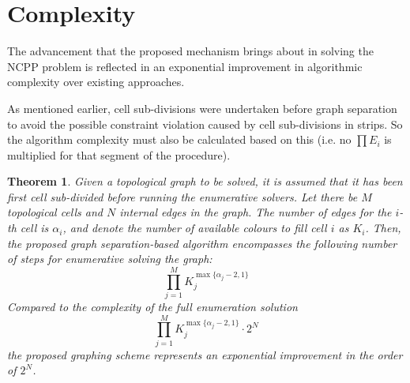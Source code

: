 \documentclass[journal]{IEEEtran}
\newtheorem{theorem}{Theorem}
\newtheorem{corollary}[theorem]{Corollary}
\begin{document}

\section{Complexity}
\label{section_complexity}
The advancement that the proposed mechanism brings about in solving the NCPP problem is reflected in an exponential improvement in algorithmic complexity over existing approaches.

As mentioned earlier, cell sub-divisions were undertaken before graph separation to avoid the possible  constraint violation caused by cell sub-divisions in strips. So the algorithm complexity must also be calculated based on this (i.e. no $\prod E_i$ is multiplied for that segment of the procedure).

\begin{theorem}
Given a topological graph to be solved, it is assumed that it has been first cell sub-divided before running the enumerative solvers. Let there be $M$ topological cells and $N$ internal edges in the graph. The number of edges for the $i$-th cell is $\alpha_i$, and denote the number of available colours to fill cell $i$ as $K_i$. Then, the proposed graph separation-based algorithm encompasses the following number of steps for enumerative solving the graph:
\begin{equation}
\prod\limits_{j = 1}^M K_j^{\max\{\alpha_j-2, 1\}}
\end{equation}
Compared to the complexity of the full enumeration solution~\cite{Yang2020Cellular}
\begin{equation}
\prod\limits_{j = 1}^M K_j^{\max\{\alpha_j-2, 1\}}\cdot 2^N
\end{equation}
the proposed graphing scheme represents an exponential improvement in 
the order of $2^N$. 
\end{theorem}
\end{document}
